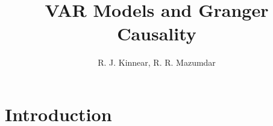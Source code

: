 
\title{VAR Models and Granger Causality}
\author{R. J. Kinnear, R. R. Mazumdar}


\maketitle
\abstract{}

\section{Introduction}

\printbibliography

